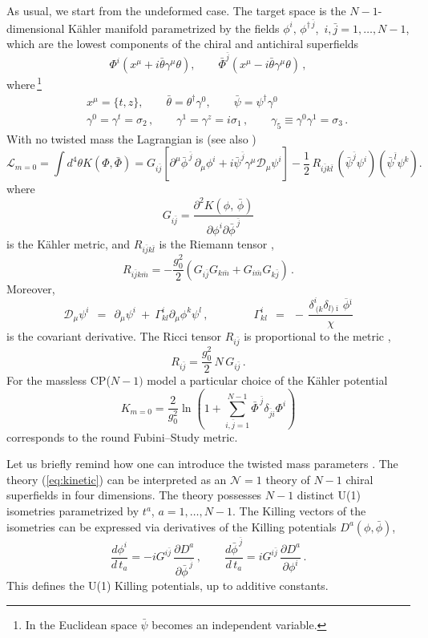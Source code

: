 \documentclass[epsfig,12pt]{article}
\def\beq{\begin{equation}}
\def\eeq{\end{equation}}
\def\beqn{\begin{eqnarray}}
\def\eeqn{\end{eqnarray}}
\newcommand{\cell}{{\mathcal L}}
\newcommand{\cde}{{\mathcal D}}
\def\beqn{\begin{eqnarray}}
\def\eeqn{\end{eqnarray}}
\def\beq{\begin{equation}}
\def\eeq{\end{equation}}
\newcommand{\ov}{\overline}
\newcommand{\bi}{{\bar \imath}}
\begin{document}
{As usual, we start from the undeformed case.
The target space is the $N-1$-dimensional K\"ahler manifold 
parametrized by the fields $\phi^{i},\,\phi^{\dagger\,\bar j}$, $\,i,\bar j=1,\ldots,N-1$,
which are the lowest components of the chiral and antichiral superfields 
\beq
\Phi^{i}(x^{\mu}+i\bar \theta \gamma^{\mu} \theta),\qquad \bar\Phi^{\bar j}(x^{\mu}-i\bar \theta \gamma^{\mu} \theta)\,,
\label{wtpi4}
\eeq
where\,\footnote{In the Euclidean space $\bar\psi$ becomes an independent variable.}
\beqn
&&
x^{\mu}=\{t,z\},\qquad \bar \theta=\theta^{\dagger}\gamma^{0},\qquad \bar \psi=\psi^{\dagger}\gamma^{0}
\nonumber
\\[2mm]
&&\gamma^{0}=\gamma^t=\sigma_2\,,\qquad \gamma^{1}=\gamma^z = i\sigma_1\,,\qquad \gamma_{5} 
\equiv\gamma^0\gamma^1 = \sigma_3\,.
\label{wtpi5}
\eeqn
With no twisted mass the Lagrangian  is \cite{Bruno}
(see also \cite{WessBagger})
\begin{equation}
\label{eq:kinetic}
{\cell}_{m=0}= \int d^{4 }\theta K(\Phi, \bar\Phi)
=G_{i\bar j} \left[\partial^\mu \bar\phi^{\,\bar j}\, \partial_\mu\phi^{i}
+i\bar \psi^{\bar j} \gamma^{\mu} \cde_{\mu}\psi^{i}\right]
-\frac{1}{2}\,R_{i\bar jk\bar l}\,(\bar\psi^{\bar j}\psi^{i})(\bar\psi^{\bar l}\psi^{k}).
\end{equation}
where
\beq
G_{i\bar j}=\frac{\partial^{2} K(\phi,\,\bar\phi)}{\partial \phi^{i}\partial \bar\phi^{\,\bar j}}
\label{wtpi6}
\eeq
 is the K\"ahler metric, and
$R_{i\bar jk\bar l}$ is the Riemann tensor \cite{Helgason}, 
\beq
R_{i\bar{j} k\bar{m}} = - \frac{g_0^2}{2}\left(G_{i\bar{j}}G_{k\bar{m}} +
G_{i\bar{m}}G_{k\bar{j}}
\right)\,.
\label{640}
\eeq
Moreover,
$$ \cde_{\mu}\psi^{i} ~~=~~
\partial_{\mu}\psi^{i} ~+~ \Gamma^{i}_{kl}\partial_{\mu} \phi^{k}\psi^{l}\,,
\qquad\qquad
	\Gamma^i_{kl} ~~=~~ -\, \frac{\delta^i_{\ (k} \delta_{l)\bi}\,\ov{\phi}{}^\bi}{\chi}
$$
is the covariant derivative.
The Ricci tensor $R_{i\bar j}$ is proportional to the metric \cite{Helgason},
\beq
\label{eq:RG}
R_{i\bar{j}} = \frac{g_{0}^2}{2}\,  N \, G_{i\bar{j}}\,.
\eeq
For the massless CP($N\!-\!1)$ model 
a particular choice of the K\"ahler potential
\begin{equation}
\label{eq:kahler}
K_{m=0}=\frac{2}{g_{0}^{2}}\ln\left(1+\sum_{i,\bar j=1}^{ N-1}\bar\Phi^{\,\bar j}\delta_{\bar j i}\Phi^{i}\right)
\end{equation}
corresponds to the round Fubini--Study metric.

Let us  briefly remind how one can introduce the twisted mass parameters \cite{twisted, Dor}.
The theory (\ref{eq:kinetic}) can be interpreted as an ${\mathcal N}=1$ theory of $N-1$ chiral superfields 
in four dimensions.  The theory possesses $N-1$ distinct   U(1) isometries 
parametrized by $t^{a}$, $a=1,\ldots,N-1$.
The Killing vectors of the isometries can be expressed via derivatives of the Killing 
potentials $D^{a}(\phi, \bar\phi)$,
\begin{equation}
\label{eq:KillD}
\frac{{d}\phi^{i}}{{  d}\,t_{a}}=-iG^{i\bar j}\,\frac{\partial D^{a}}{\partial \bar\phi^{ \,\bar j}}
\,,\qquad 
\frac{{d}\bar\phi^{ \,\bar j}}{{  d}\,t_{a}}=iG^{i\bar j}\,\frac{\partial D^{a}}{\partial \phi^{i}}\,.
\end{equation}
This defines the U(1) Killing potentials, up to additive constants.

}
\end{document}
